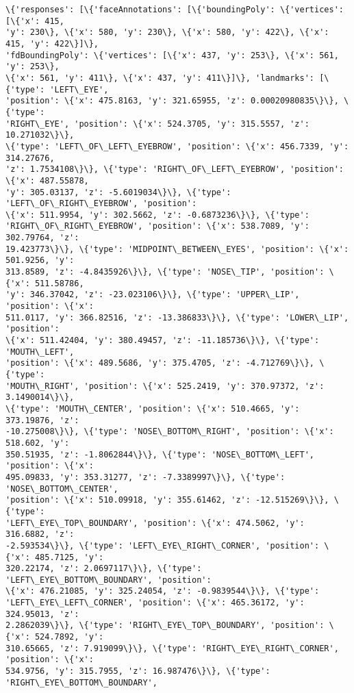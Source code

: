 \documentclass[11pt]{article}
\begin{document}
    \begin{Verbatim}[commandchars=\\\{\}]
\{'responses': [\{'faceAnnotations': [\{'boundingPoly': \{'vertices': [\{'x': 415,
'y': 230\}, \{'x': 580, 'y': 230\}, \{'x': 580, 'y': 422\}, \{'x': 415, 'y': 422\}]\},
'fdBoundingPoly': \{'vertices': [\{'x': 437, 'y': 253\}, \{'x': 561, 'y': 253\},
\{'x': 561, 'y': 411\}, \{'x': 437, 'y': 411\}]\}, 'landmarks': [\{'type': 'LEFT\_EYE',
'position': \{'x': 475.8163, 'y': 321.65955, 'z': 0.00020980835\}\}, \{'type':
'RIGHT\_EYE', 'position': \{'x': 524.3705, 'y': 315.5557, 'z': 10.271032\}\},
\{'type': 'LEFT\_OF\_LEFT\_EYEBROW', 'position': \{'x': 456.7339, 'y': 314.27676,
'z': 1.7534108\}\}, \{'type': 'RIGHT\_OF\_LEFT\_EYEBROW', 'position': \{'x': 487.55878,
'y': 305.03137, 'z': -5.6019034\}\}, \{'type': 'LEFT\_OF\_RIGHT\_EYEBROW', 'position':
\{'x': 511.9954, 'y': 302.5662, 'z': -0.6873236\}\}, \{'type':
'RIGHT\_OF\_RIGHT\_EYEBROW', 'position': \{'x': 538.7089, 'y': 302.79764, 'z':
19.423773\}\}, \{'type': 'MIDPOINT\_BETWEEN\_EYES', 'position': \{'x': 501.9256, 'y':
313.8589, 'z': -4.8435926\}\}, \{'type': 'NOSE\_TIP', 'position': \{'x': 511.58786,
'y': 346.37042, 'z': -23.023106\}\}, \{'type': 'UPPER\_LIP', 'position': \{'x':
511.0117, 'y': 366.82516, 'z': -13.386833\}\}, \{'type': 'LOWER\_LIP', 'position':
\{'x': 511.42404, 'y': 380.49457, 'z': -11.185736\}\}, \{'type': 'MOUTH\_LEFT',
'position': \{'x': 489.5686, 'y': 375.4705, 'z': -4.712769\}\}, \{'type':
'MOUTH\_RIGHT', 'position': \{'x': 525.2419, 'y': 370.97372, 'z': 3.1490014\}\},
\{'type': 'MOUTH\_CENTER', 'position': \{'x': 510.4665, 'y': 373.19876, 'z':
-10.275008\}\}, \{'type': 'NOSE\_BOTTOM\_RIGHT', 'position': \{'x': 518.602, 'y':
350.51935, 'z': -1.8062844\}\}, \{'type': 'NOSE\_BOTTOM\_LEFT', 'position': \{'x':
495.09833, 'y': 353.31277, 'z': -7.3389997\}\}, \{'type': 'NOSE\_BOTTOM\_CENTER',
'position': \{'x': 510.09918, 'y': 355.61462, 'z': -12.515269\}\}, \{'type':
'LEFT\_EYE\_TOP\_BOUNDARY', 'position': \{'x': 474.5062, 'y': 316.6882, 'z':
-2.593534\}\}, \{'type': 'LEFT\_EYE\_RIGHT\_CORNER', 'position': \{'x': 485.7125, 'y':
320.22174, 'z': 2.0697117\}\}, \{'type': 'LEFT\_EYE\_BOTTOM\_BOUNDARY', 'position':
\{'x': 476.21085, 'y': 325.24054, 'z': -0.9839544\}\}, \{'type':
'LEFT\_EYE\_LEFT\_CORNER', 'position': \{'x': 465.36172, 'y': 324.95013, 'z':
2.2862039\}\}, \{'type': 'RIGHT\_EYE\_TOP\_BOUNDARY', 'position': \{'x': 524.7892, 'y':
310.65665, 'z': 7.919099\}\}, \{'type': 'RIGHT\_EYE\_RIGHT\_CORNER', 'position': \{'x':
534.9756, 'y': 315.7955, 'z': 16.987476\}\}, \{'type': 'RIGHT\_EYE\_BOTTOM\_BOUNDARY',

\end{Verbatim}
\end{document}
